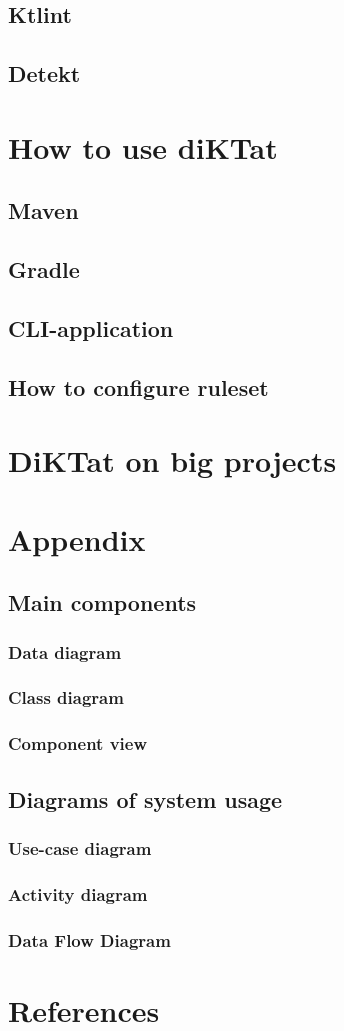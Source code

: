 \documentclass[12pt]{article}
\begin{document}
\subsection{Ktlint}
\subsection{Detekt}
\newpage

\section{How to use diKTat}
\subsection{Maven}
\subsection{Gradle}
\subsection{CLI-application}
\subsection{How to configure ruleset}
\newpage

\section{DiKTat on big projects}

\newpage
\section{Appendix}
\subsection{Main components}
\subsubsection{Data diagram}
\subsubsection{Class diagram}
\subsubsection{Component view}

\subsection{Diagrams of system usage}
\subsubsection{Use-case diagram}
\subsubsection{Activity diagram}
\subsubsection{Data Flow Diagram}

\newpage
\section{References}
\end{document}

